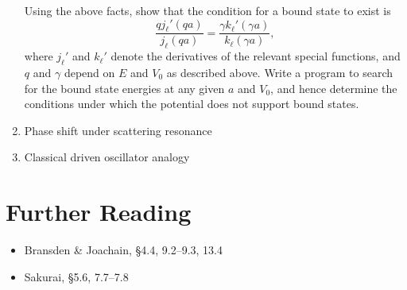 \documentclass[pra,12pt]{revtex4}
\begin{document}
\begin{enumerate}
  Using the above facts, show that the condition for a bound state to
  exist is
  $$\frac{qj_\ell'(qa)}{j_\ell(qa)} = \frac{\gamma k_\ell'(\gamma a)}{k_\ell(\gamma a)},$$
  where $j_\ell'$ and $k_\ell'$ denote the derivatives of the relevant
  special functions, and $q$ and $\gamma$ depend on $E$ and $V_0$ as
  described above.  Write a program to search for the bound state
  energies at any given $a$ and $V_0$, and hence determine the
  conditions under which the potential does not support bound
  states.



\label{ex:boundstate3d}

\item Phase shift under scattering resonance

\item Classical driven oscillator analogy  
\end{enumerate}




\section*{Further Reading}

\begin{itemize}
\item Bransden \& Joachain, \S4.4, 9.2--9.3, 13.4
\item Sakurai, \S5.6, 7.7--7.8

\end{itemize}
\end{document}
